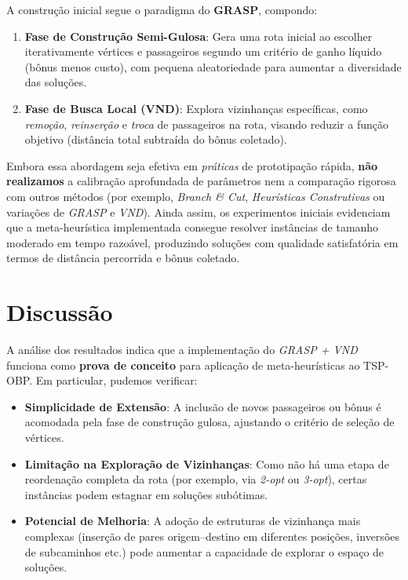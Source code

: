 \documentclass[12pt, a4paper]{report}
\begin{document}
A construção inicial segue o paradigma do \textbf{GRASP}, compondo:
\begin{enumerate}
    \item \textbf{Fase de Construção Semi-Gulosa}: Gera uma rota inicial ao escolher iterativamente vértices e passageiros segundo um critério de ganho líquido (bônus menos custo), com pequena aleatoriedade para aumentar a diversidade das soluções.
    \item \textbf{Fase de Busca Local (VND)}: Explora vizinhanças específicas, como \emph{remoção}, \emph{reinserção} e \emph{troca} de passageiros na rota, visando reduzir a função objetivo (distância total subtraída do bônus coletado).
\end{enumerate}

Embora essa abordagem seja efetiva em \emph{práticas} de prototipação rápida, \textbf{não realizamos} a calibração aprofundada de parâmetros nem a comparação rigorosa com outros métodos (por exemplo, \emph{Branch \& Cut}, \emph{Heurísticas Construtivas} ou variações de \emph{GRASP} e \emph{VND}). Ainda assim, os experimentos iniciais evidenciam que a meta-heurística implementada consegue resolver instâncias de tamanho moderado em tempo razoável, produzindo soluções com qualidade satisfatória em termos de distância percorrida e bônus coletado.

\section{Discussão}

A análise dos resultados indica que a implementação do \emph{GRASP + VND} funciona como \textbf{prova de conceito} para aplicação de meta-heurísticas ao TSP-OBP. Em particular, pudemos verificar:

\begin{itemize}
    \item \textbf{Simplicidade de Extensão}: A inclusão de novos passageiros ou bônus é acomodada pela fase de construção gulosa, ajustando o critério de seleção de vértices.
    \item \textbf{Limitação na Exploração de Vizinhanças}: Como não há uma etapa de reordenação completa da rota (por exemplo, via \emph{2-opt} ou \emph{3-opt}), certas instâncias podem estagnar em soluções subótimas.
    \item \textbf{Potencial de Melhoria}: A adoção de estruturas de vizinhança mais complexas (inserção de pares origem–destino em diferentes posições, inversões de subcaminhos etc.) pode aumentar a capacidade de explorar o espaço de soluções.
\end{itemize}
\end{document}
